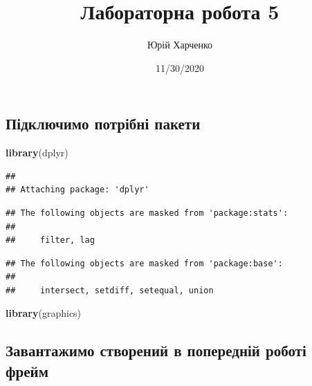 \documentclass[
]{article}
\title{Лабораторна робота 5}
\author{Юрій Харченко}
\date{11/30/2020}
\newenvironment{Shaded}{\begin{snugshade}}{\end{snugshade}}
\newcommand{\KeywordTok}[1]{\textcolor[rgb]{0.13,0.29,0.53}{\textbf{#1}}}
\newcommand{\NormalTok}[1]{#1}
\begin{document}
\maketitle

\hypertarget{ux43fux456ux434ux43aux43bux44eux447ux438ux43cux43e-ux43fux43eux442ux440ux456ux431ux43dux456-ux43fux430ux43aux435ux442ux438}{%
\subsection{Підключимо потрібні
пакети}\label{ux43fux456ux434ux43aux43bux44eux447ux438ux43cux43e-ux43fux43eux442ux440ux456ux431ux43dux456-ux43fux430ux43aux435ux442ux438}}

\begin{Shaded}
\begin{Highlighting}[]
\KeywordTok{library}\NormalTok{(dplyr)}
\end{Highlighting}
\end{Shaded}

\begin{verbatim}
## 
## Attaching package: 'dplyr'
\end{verbatim}

\begin{verbatim}
## The following objects are masked from 'package:stats':
## 
##     filter, lag
\end{verbatim}

\begin{verbatim}
## The following objects are masked from 'package:base':
## 
##     intersect, setdiff, setequal, union
\end{verbatim}

\begin{Shaded}
\begin{Highlighting}[]
\KeywordTok{library}\NormalTok{(graphics)}
\end{Highlighting}
\end{Shaded}

\hypertarget{ux437ux430ux432ux430ux43dux442ux430ux436ux438ux43cux43e-ux441ux442ux432ux43eux440ux435ux43dux438ux439-ux432-ux43fux43eux43fux435ux440ux435ux434ux43dux456ux439-ux440ux43eux431ux43eux442ux456-ux444ux440ux435ux439ux43c}{%
\subsection{Завантажимо створений в попередній роботі
фрейм}\label{ux437ux430ux432ux430ux43dux442ux430ux436ux438ux43cux43e-ux441ux442ux432ux43eux440ux435ux43dux438ux439-ux432-ux43fux43eux43fux435ux440ux435ux434ux43dux456ux439-ux440ux43eux431ux43eux442ux456-ux444ux440ux435ux439ux43c}}
\end{document}
